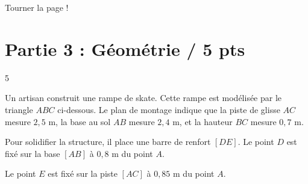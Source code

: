 \documentclass[a4paper]{book}
\begin{document}
{\vfill
\hfill Tourner la page !
\newpage

\section*{Partie 3 : Géométrie \points[2]/ 5 pts }

    
    \begin{exerciceNote}{5}
        \begin{minipage}{0.5\linewidth}
            Un artisan construit une rampe de skate. Cette rampe est modélisée par le triangle $ABC$ ci-dessous.
            Le plan de montage indique que la piste de glisse $AC$ mesure $2,5\text{ m}$, la base au sol $AB$ mesure $2,4\text{ m}$, et la hauteur $BC$ mesure $0,7\text{ m}$.
            
            Pour solidifier la structure, il place une barre de renfort $[DE]$. Le point $D$ est fixé sur la base $[AB]$ à $0,8\text{ m}$ du point $A$. 
            
            Le point $E$ est fixé sur la piste $[AC]$ à $0,85\text{ m}$ du point $A$.
        \end{minipage}
        \hfill
        \begin{minipage}{0.49\linewidth}
            \begin{center}
\end{center}
\end{minipage}
\end{exerciceNote}}
\end{document}
